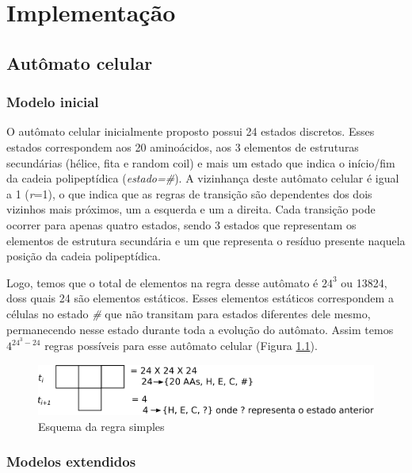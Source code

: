 \chapter{Implementação}

\section{Autômato celular}\label{sssec:ca}

\subsection{Modelo inicial}

O autômato celular inicialmente proposto possui 24 estados discretos. Esses estados correspondem aos 20 aminoácidos, aos 3 elementos de estruturas secundárias (hélice, fita e random coil) e mais um estado que indica o início/fim da cadeia polipeptídica (\textit{estado=\#}). A vizinhança deste autômato celular é igual a 1 (\textit{r}=1),  o que indica que as regras de transição são dependentes dos dois vizinhos mais próximos, um a esquerda e um a direita. Cada transição pode ocorrer para apenas quatro estados, sendo 3 estados que representam os elementos de estrutura secundária e um que representa o resíduo presente naquela posição da cadeia polipeptídica.

Logo, temos que o total de elementos na regra desse autômato é $24^3$ ou 13824, doss quais 24 são elementos estáticos. Esses elementos estáticos correspondem a células no estado \textit{\#}  que não transitam para estados diferentes dele mesmo, permanecendo nesse estado durante toda a evolução do autômato. Assim temos $4^{24^3-24}$ regras possíveis para esse autômato celular (Figura \ref{fig:ca_rule_scheme}).

\begin{figure}
  \centering
  \includegraphics[width=.8\textwidth]{figures/ca_rule_scheme.pdf}
  \caption{Esquema da regra simples}
        \label{fig:ca_rule_scheme}
\end{figure}

\subsection{Modelos extendidos}

